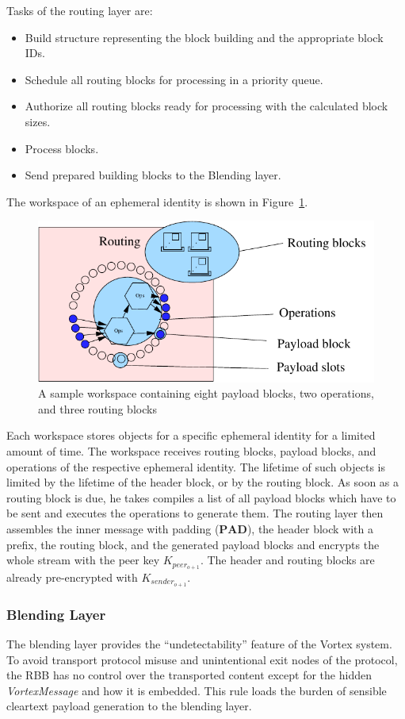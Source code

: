 \documentclass[acmsmall, screen]{acmart}
\begin{document}
Tasks of the routing layer are:
\begin{itemize}
	\item Build structure representing the block building and the appropriate block IDs.
	\item Schedule all routing blocks for processing in a priority queue.
	\item Authorize all routing blocks ready for processing with the calculated block sizes.
	\item Process blocks.
	\item Send prepared building blocks to the Blending layer.
\end{itemize}

The workspace of an ephemeral identity is shown in Figure~\ref{fig:workspace}.

\begin{figure}[ht]
	\centering\includegraphics[width=0.6\columnwidth]{../../inc/roughProtocolDesign_workspace}
	\caption{A sample workspace containing eight payload blocks, two operations, and three routing blocks}
	\label{fig:workspace}
\end{figure}

Each workspace stores objects for a specific ephemeral identity for a limited amount of time. The workspace receives routing blocks, payload blocks, and operations of the respective ephemeral identity. The lifetime of such objects is limited by the lifetime of the header block, or by the routing block. As soon as a routing block is due, he takes compiles a list of all payload blocks which have to be sent and executes the operations to generate them. The routing layer then assembles the inner message with padding ($\mathbf{PAD}$), the header block with a prefix, the routing block, and the generated payload blocks and encrypts the whole stream with the peer key $K_{peer_{o+1}}$. The header and routing blocks are already pre-encrypted with $K_{sender_{o+1}}$.

\subsubsection{Blending Layer}
The blending layer provides the ``undetectability'' feature of the Vortex system. To avoid transport protocol misuse and unintentional exit nodes of the protocol, the RBB has no control over the transported content except for the hidden \emph{VortexMessage} and how it is embedded. This rule loads the burden of sensible cleartext payload generation to the blending layer. 
\end{document}
